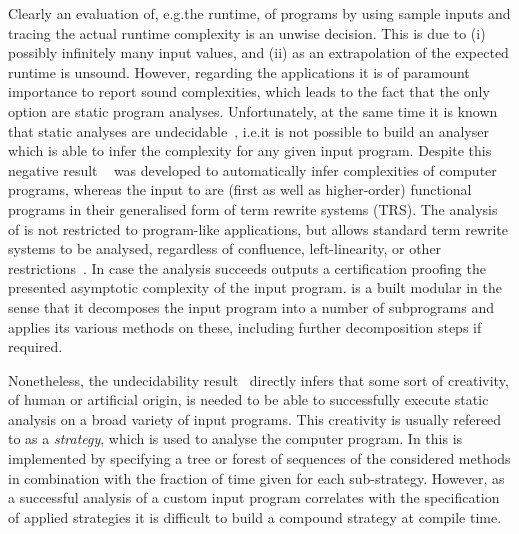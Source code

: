 \documentclass[envcountsame]{llncs}
\begin{document}
Clearly an evaluation of, e.g.\@ the runtime, of programs by using sample inputs and tracing the
actual runtime complexity is an unwise decision. This is due to (i) possibly infinitely many input
values, and (ii) as an extrapolation of the expected runtime is unsound. However, regarding the
applications it is of paramount importance to report sound complexities, which leads to the fact
that the only option are static program analyses. Unfortunately, at the same time it is known that
static analyses are undecidable~\cite{landi1992undecidability}, i.e.\@ it is not possible to build
an analyser which is able to infer the complexity for any given input program.
%
Despite this negative result \tct{}~\cite{avanzini2016tct} was developed to automatically infer
complexities of computer programs, whereas the input to \tct{} are (first as well as higher-order)
functional programs in their generalised form of term rewrite systems (TRS). The analysis of \tct{}
is not restricted to program-like applications, but allows standard term rewrite systems to be
analysed, regardless of confluence, left-linearity, or other restrictions~\cite{avanzini2016tct}. In
case the analysis succeeds \tct{} outputs a certification proofing the presented asymptotic
complexity of the input program. \tct{} is a built modular in the sense that it decomposes the input
program into a number of subprograms and applies its various methods on these, including further
decomposition steps if required. 

Nonetheless, the undecidability result~\cite{landi1992undecidability} directly infers that some sort
of creativity, of human or artificial origin, is needed to be able to successfully execute static
analysis on a broad variety of input programs. This creativity is usually refereed to as a
\textit{strategy}, which is used to analyse the computer program. In \tct{} this is implemented by
specifying a tree or forest of sequences of the considered methods in combination with the fraction
of time given for each sub-strategy. However, as a successful analysis of a custom input program
correlates with the specification of applied strategies it is difficult to build a compound strategy
at compile time.
\end{document}
